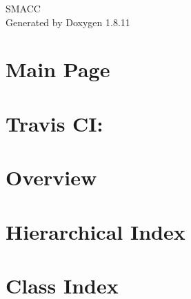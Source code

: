 \documentclass[twoside]{book}
\newcommand{\+}{\discretionary{\mbox{\scriptsize$\hookleftarrow$}}{}{}}
\newcommand{\clearemptydoublepage}{%
  \newpage{\pagestyle{empty}\cleardoublepage}%
}
\begin{document}
\hypersetup{pageanchor=false,
             bookmarksnumbered=true,
             pdfencoding=unicode
            }
\begin{titlepage}
\vspace*{7cm}
\begin{center}%
{\Large S\+M\+A\+CC }\\
\vspace*{1cm}
{\large Generated by Doxygen 1.8.11}\\
\end{center}
\end{titlepage}
\clearemptydoublepage
\tableofcontents
\clearemptydoublepage
{}
\hypersetup{pageanchor=true}

\chapter{Main Page}
\label{index}\hypertarget{index}{}
\chapter{Travis CI\+:}
\label{md_README}
\hypertarget{md_README}{}

\chapter{Overview}
\label{md_rosdoc_lite_README}
\hypertarget{md_rosdoc_lite_README}{}

\chapter{Hierarchical Index}

\chapter{Class Index}

\end{document}
